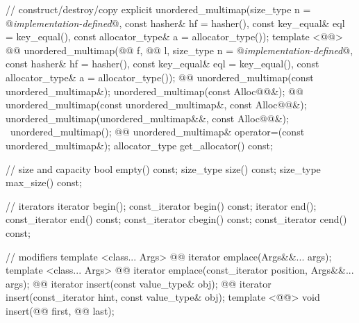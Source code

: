 \documentclass[american,twoside]{book}
\begin{document}
\begin{codeblock}
{{    // construct/destroy/copy
    explicit unordered_multimap(size_type n = @\textit{implementation-defined}@,
                                const hasher& hf = hasher(),
                                const key_equal& eql = key_equal(),
                                const allocator_type& a = allocator_type());
    template <@@>
      @@
      unordered_multimap(@@ f, @@ l,
                         size_type n = @\textit{implementation-defined}@,
                         const hasher& hf = hasher(),
                         const key_equal& eql = key_equal(),
                         const allocator_type& a = allocator_type());
    @@ 
      unordered_multimap(const unordered_multimap&);
    unordered_multimap(const Alloc@@&);
    @@
       unordered_multimap(const unordered_multimap&, const Alloc@@&);
    unordered_multimap(unordered_multimap&&, const Alloc@@&);
    ~unordered_multimap();
    @@
      unordered_multimap& operator=(const unordered_multimap&);
    allocator_type get_allocator() const;

    // size and capacity
    bool empty() const;
    size_type size() const;
    size_type max_size() const;

    // iterators
    iterator       begin();
    const_iterator begin() const;
    iterator       end();
    const_iterator end() const;
    const_iterator cbegin() const;
    const_iterator cend() const;

    // modifiers
    template <class... Args> 
      @@
      iterator emplace(Args&&... args);
    template <class... Args> 
      @@
      iterator emplace(const_iterator position, Args&&... args);
    @@ 
      iterator insert(const value_type& obj);
    @@ 
      iterator insert(const_iterator hint, const value_type& obj);
    template <@@> 
      void insert(@@ first, @@ last);

}}
\end{codeblock}
\end{document}
